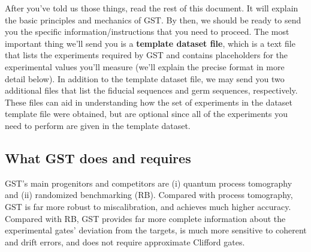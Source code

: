\documentclass{article}[11pt]
\begin{document}
After you've told us those things, read the rest of this document.  It will explain the basic principles and mechanics of GST.  By then, we should be ready to send you the specific information/instructions that you need to proceed.  The most important thing we'll send you is a \textbf{template dataset file}, which is a text file that lists the experiments required by GST and contains placeholders for the experimental values you'll measure (we'll explain the precise format in more detail below).  In addition to the template dataset file, we may send you two additional files that list the fiducial sequences and germ sequences, respectively. These files can aid in understanding how the set of experiments in the dataset template file were obtained, but are optional since all of the experiments you need to perform are given in the template dataset.


\subsection{What GST does and requires}\label{whatGSTDoes}

GST's main progenitors and competitors are (i) quantum process tomography and (ii) randomized benchmarking (RB).  Compared with process tomography, GST is far more robust to miscalibration, and achieves much higher accuracy.  Compared with RB, GST provides far more complete information about the experimental gates' deviation from the targets, is much more sensitive to coherent and drift errors, and does not require approximate Clifford gates.
\end{document}
